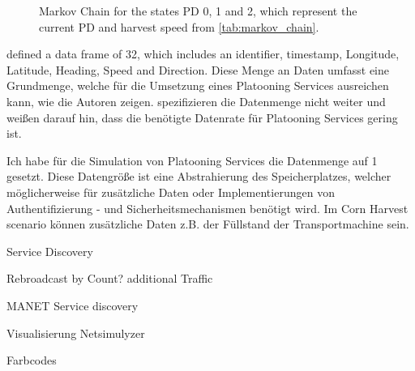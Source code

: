 \begin{figure}
\centering
{}
\caption{Markov Chain for the states \acf{PD} 0, 1 and 2, which represent the current \ac{PD} and harvest speed
from \autoref{tab:markov_chain}.}
\label{fig:ConnectionStates}
\end{figure}


\textcite{zhang_method_2009} defined a data frame of \SI{32}{\byte}, which includes an identifier, timestamp, Longitude, Latitude, Heading, Speed and Direction.
Diese Menge an Daten umfasst eine Grundmenge, welche für die Umsetzung eines Platooning Services ausreichen kann, wie die Autoren zeigen.
\textcite{schlingmann_aef_2019} spezifizieren die Datenmenge nicht weiter und weißen darauf hin, dass die benötigte Datenrate für Platooning Services gering ist.

Ich habe für die Simulation von Platooning Services die Datenmenge auf \SI{1}{\kilo\byte} gesetzt. Diese Datengröße ist eine Abstrahierung des Speicherplatzes, welcher möglicherweise für zusätzliche Daten oder Implementierungen von Authentifizierung -  und Sicherheitsmechanismen benötigt wird. Im Corn Harvest scenario können zusätzliche Daten z.B. der Füllstand der Transportmachine sein. 


Service Discovery

Rebroadcast by Count?
additional Traffic

MANET Service discovery

Visualisierung Netsimulyzer

Farbcodes

